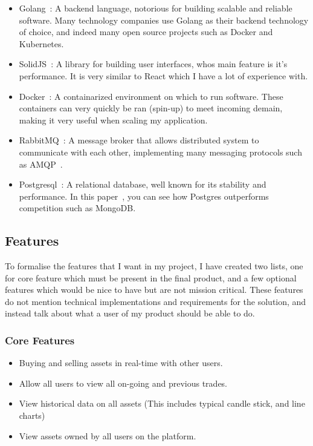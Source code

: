 \documentclass[titlepage]{article}
\begin{document}
\begin{itemize}
	\item Golang~\cite{golang}: A backend language, notorious for building scalable and reliable software. Many technology companies use Golang as their backend technology of choice, and indeed many open source projects such as Docker and Kubernetes.
  \item SolidJS~\cite{solidjs}: A library for building user interfaces, whos main feature is it's performance. It is very similar to React which I have a lot of experience with.
	\item Docker~\cite{docker}: A containarized environment on which to run software. These containers can very quickly be ran (spin-up) to meet incoming demain, making it very useful when scaling my application.
  \item RabbitMQ~\cite{rabbitmq}: A message broker that allows distributed system to communicate with each other, implementing many messaging protocols such as AMQP~\cite{amqp}.
  \item Postgresql~\cite{postgres}: A relational database, well known for its stability and performance. In this paper~\cite{makris2019performance}, you can see how Postgres outperforms competition such as MongoDB.
\end{itemize}

\subsection{Features}
To formalise the features that I want in my project, I have created two lists, one for core feature which must be present in the final product, and a few optional features which would be nice to have but are not mission critical. These features do not mention technical implementations and requirements for the solution, and instead talk about what a user of my product should be able to do.

\subsubsection{Core Features}
\begin{itemize}
	\item Buying and selling assets in real-time with other users.
	\item Allow all users to view all on-going and previous trades.
	\item View historical data on all assets (This includes typical candle stick, and line charts)
	\item View assets owned by all users on the platform.
\end{itemize}
\end{document}
